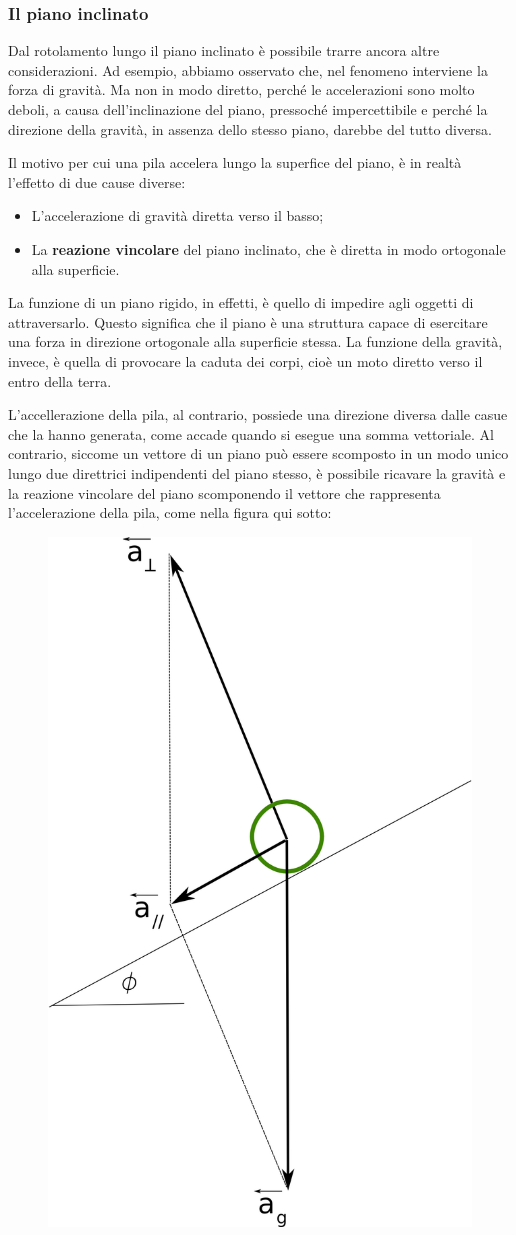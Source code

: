 \subsubsection*{Il piano inclinato}

Dal rotolamento lungo il piano inclinato è possibile trarre ancora altre considerazioni.
Ad esempio, abbiamo osservato che, nel fenomeno interviene la forza di gravità. Ma non in modo diretto, perché le accelerazioni sono molto deboli, a causa dell'inclinazione del piano, pressoché impercettibile e perché la direzione della gravità, in assenza dello stesso piano, darebbe del tutto diversa.\newline

Il motivo per cui una pila accelera lungo la superfice del piano, è in realtà l'effetto di due cause diverse:\newline

\begin{itemize}
\item L'accelerazione di gravità diretta verso il basso;
\item La {\bf reazione vincolare} del piano inclinato, che è diretta in modo ortogonale alla superficie.
\end{itemize}

La funzione di un piano rigido, in effetti, è quello di impedire agli oggetti di attraversarlo. Questo significa che il piano è una struttura capace di esercitare una forza in direzione ortogonale alla superficie stessa. La funzione della gravità, invece, è quella di provocare la caduta dei corpi, cioè un moto diretto verso il entro della terra.

L'accellerazione della pila, al contrario, possiede una direzione diversa dalle casue che la hanno generata, come accade quando si esegue una somma vettoriale. Al contrario, siccome un vettore di un piano può essere scomposto in un modo unico lungo due direttrici indipendenti del piano stesso, è possibile ricavare la gravità e la reazione vincolare del piano scomponendo il vettore che rappresenta l'accelerazione della pila, come nella figura qui sotto:

\begin{figure}[H]
 \centering
 \includegraphics[width=.3\textwidth]{../immagini/gravitaEvincolo.png}
 \label{fig:gravita e reazione vincolare}
\end{figure}

